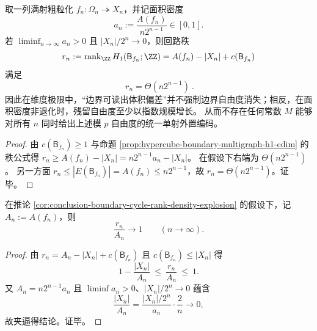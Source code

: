\begin{corollary}[面积密度非退化时回路秩的指数尺度]\label{cor:conclusion-boundary-cycle-rank-density-explosion}
取一列满射粗粒化 \(f_n:\Omega_n\twoheadrightarrow X_n\)，并记面积密度
\[
a_n:=\frac{A(f_n)}{n2^{n-1}}\in[0,1].
\]
若 \(\liminf_{n\to\infty}a_n>0\) 且 \(|X_n|/2^n\to 0\)，则回路秩
\[
r_n:=\operatorname{rank}_{\ZZ}H_1(\mathsf B_{f_n};\ZZ)=A(f_n)-|X_n|+c(\mathsf B_{f_n})
\]
满足
\[
\boxed{\ r_n=\Theta(n2^{n-1})\ }.
\]
因此在维度极限中，“边界可读出体积偏差”并不强制边界自由度消失；相反，在面积密度非退化时，残留自由度至少以指数规模增长。
从而不存在任何常数 \(M\) 能够对所有 \(n\) 同时给出上述模 \(p\) 自由度的统一单射外置编码。
\end{corollary}
\begin{proof}
由 \(c(\mathsf B_{f_n})\ge 1\) 与命题 \ref{prop:hypercube-boundary-multigraph-h1-cdim} 的秩公式得
\(
r_n\ge A(f_n)-|X_n|
=n2^{n-1}a_n-|X_n|
\)。
在假设下右端为 \(\Theta(n2^{n-1})\)。
另一方面 \(r_n\le |E(\mathsf B_{f_n})|=A(f_n)\le n2^{n-1}\)，故 \(r_n=\Theta(n2^{n-1})\)。证毕。
\end{proof}

\begin{corollary}[面积密度非退化下的回路秩饱和]\label{cor:conclusion-boundary-cycle-rank-saturation}
在推论 \ref{cor:conclusion-boundary-cycle-rank-density-explosion} 的假设下，记 \(A_n:=A(f_n)\)，则
\[
\frac{r_n}{A_n}\longrightarrow 1\qquad(n\to\infty).
\]
\end{corollary}
\begin{proof}
由 \(r_n=A_n-|X_n|+c(\mathsf B_{f_n})\) 且 \(c(\mathsf B_{f_n})\le |X_n|\) 得
\[
1-\frac{|X_n|}{A_n}\ \le\ \frac{r_n}{A_n}\ \le\ 1.
\]
又 \(A_n=n2^{n-1}a_n\) 且 \(\liminf a_n>0\)、\(|X_n|/2^n\to 0\) 蕴含
\[
\frac{|X_n|}{A_n}
=\frac{|X_n|/2^n}{a_n}\cdot\frac{2}{n}\longrightarrow 0,
\]
故夹逼得结论。证毕。
\end{proof}

